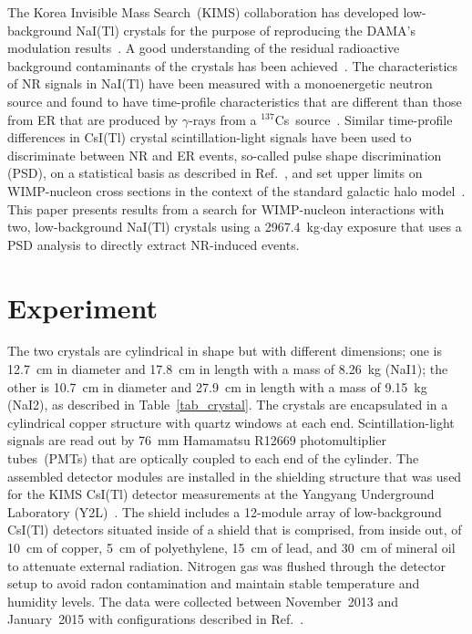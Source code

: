 \documentclass[a4paper,11pt]{article}
\def\cs{$^{137}$Cs~}
\begin{document}
The Korea Invisible Mass Search~(KIMS) collaboration has developed low-background NaI(Tl) crystals for the purpose
of reproducing the DAMA's modulation results~\cite{kwkim15,adhikari16}.  A good understanding of the residual
radioactive background contaminants of the crystals has been achieved~\cite{Adhikari:2017gbj}. The characteristics
of NR signals in NaI(Tl) have been measured with a monoenergetic neutron source and found to have time-profile
characteristics that are different than those from ER that are produced by $\gamma$-rays from a
\cs source~\cite{Lee:2015iaa}. Similar time-profile differences in CsI(Tl) crystal scintillation-light signals have
been used to discriminate between NR and ER events, so-called pulse shape discrimination (PSD), on a statistical basis
as described in Ref.~\cite{hslee07,sckim12}, and set upper limits on WIMP-nucleon cross sections in the context of the
standard galactic halo model~\cite{Lewin:1995rx}.  This paper presents results from a search for WIMP-nucleon
interactions with two, low-background NaI(Tl) crystals using a 2967.4~kg$\cdot$day exposure that uses a PSD analysis
to directly extract NR-induced events.

\section{Experiment}
The two crystals are cylindrical in shape but with different dimensions; one is 12.7~cm in diameter and 17.8~cm in
length with a mass of 8.26~kg (NaI1); the other is 10.7~cm in diameter and 27.9~cm in length with a mass of 9.15~kg
(NaI2), as described in Table~\ref{tab_crystal}. The crystals are encapsulated in a cylindrical copper structure with
quartz windows at each end. Scintillation-light signals are read out by 76~mm Hamamatsu R12669 photomultiplier tubes~(PMTs)
that are optically coupled to each end of the cylinder.  The assembled detector modules are installed in the
shielding structure that was used for the KIMS CsI(Tl) detector measurements at the Yangyang Underground
Laboratory (Y2L)~\cite{Lee:2005qr,kims_crys1,sckim12}.  The shield includes a 12-module array of low-background
CsI(Tl) detectors situated inside of a shield that is comprised, from inside out, of 10~cm of copper, 5~cm of
polyethylene, 15~cm of lead, and 30~cm of mineral oil to attenuate external radiation. Nitrogen gas was flushed
through the detector setup to avoid radon contamination and maintain stable temperature and humidity levels. The data
were collected between November~2013 and January~2015 with configurations described in Ref.~\cite{kwkim15}.
\end{document}
